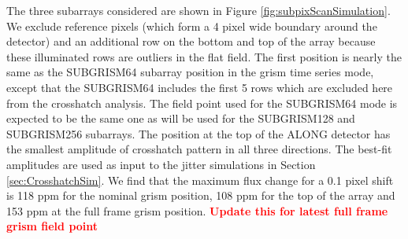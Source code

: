 \documentclass{aastex62}
\begin{document}
The three subarrays considered are shown in Figure \ref{fig:subpixScanSimulation}.
We exclude reference pixels (which form a 4 pixel wide boundary around the detector) and an additional row on the bottom and top of the array because these illuminated rows are outliers in the flat field.
The first position is nearly the same as the SUBGRISM64 subarray position in the grism time series mode, except that the SUBGRISM64 includes the first 5 rows which are excluded here from the crosshatch analysis.
The field point used for the SUBGRISM64 mode is expected to be the same one as will be used for the SUBGRISM128 and SUBGRISM256 subarrays.
The position at the top of the ALONG detector has the smallest amplitude of crosshatch pattern in all three directions.
The best-fit amplitudes are used as input to the jitter simulations in Section \ref{sec:CrosshatchSim}.
We find that the maximum flux change for a 0.1 pixel shift is 118 ppm for the nominal grism position, 108 ppm for the top of the array and 153 ppm at the full frame grism position.
\textcolor{red}{\textbf{Update this for latest full frame grism field point}}
\end{document}
